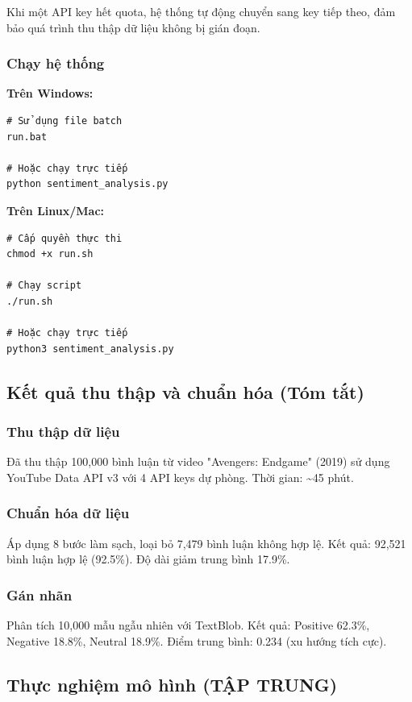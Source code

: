 Khi một API key hết quota, hệ thống tự động chuyển sang key tiếp theo, đảm bảo quá trình thu thập dữ liệu không bị gián đoạn.

\subsubsection{Chạy hệ thống}
\textbf{Trên Windows:}
\begin{verbatim}
# Sử dụng file batch
run.bat

# Hoặc chạy trực tiếp
python sentiment_analysis.py
\end{verbatim}

\textbf{Trên Linux/Mac:}
\begin{verbatim}
# Cấp quyền thực thi
chmod +x run.sh

# Chạy script
./run.sh

# Hoặc chạy trực tiếp
python3 sentiment_analysis.py
\end{verbatim}

\subsection{Kết quả thu thập và chuẩn hóa (Tóm tắt)}

\subsubsection{Thu thập dữ liệu}
Đã thu thập 100,000 bình luận từ video "Avengers: Endgame" (2019) sử dụng YouTube Data API v3 với 4 API keys dự phòng. Thời gian: \textasciitilde 45 phút.

\subsubsection{Chuẩn hóa dữ liệu}
Áp dụng 8 bước làm sạch, loại bỏ 7,479 bình luận không hợp lệ. Kết quả: 92,521 bình luận hợp lệ (92.5\%). Độ dài giảm trung bình 17.9\%.

\subsubsection{Gán nhãn}
Phân tích 10,000 mẫu ngẫu nhiên với TextBlob. Kết quả: Positive 62.3\%, Negative 18.8\%, Neutral 18.9\%. Điểm trung bình: 0.234 (xu hướng tích cực).

\subsection{Thực nghiệm mô hình (TẬP TRUNG)}

